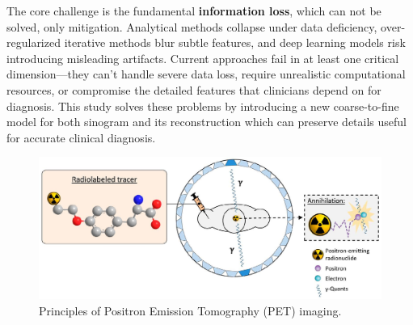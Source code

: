 \documentclass[
reprint,
superscriptaddress,
nofootinbib,
amsmath,amssymb,
aps,
prd,
]{revtex4-2}
\begin{document}
The core challenge is the fundamental \textbf{information loss}, which can not be solved, only mitigation. Analytical methods collapse under data deficiency, over-regularized iterative methods blur subtle features, and deep learning models risk introducing misleading artifacts. Current approaches fail in at least one critical dimension—they can't handle severe data loss, require unrealistic computational resources, or compromise the detailed features that clinicians depend on for diagnosis. 
This study solves these problems by introducing a new coarse-to-fine model for both sinogram and its reconstruction which can preserve details useful for accurate clinical diagnosis.
\begin{figure}[htbp]
	\centering
	\includegraphics[scale=0.47]{./Images/graph.jpg}
	\caption{Principles of Positron Emission Tomography (PET) imaging.}
	\label{fig:graph}
\end{figure}
\end{document}
